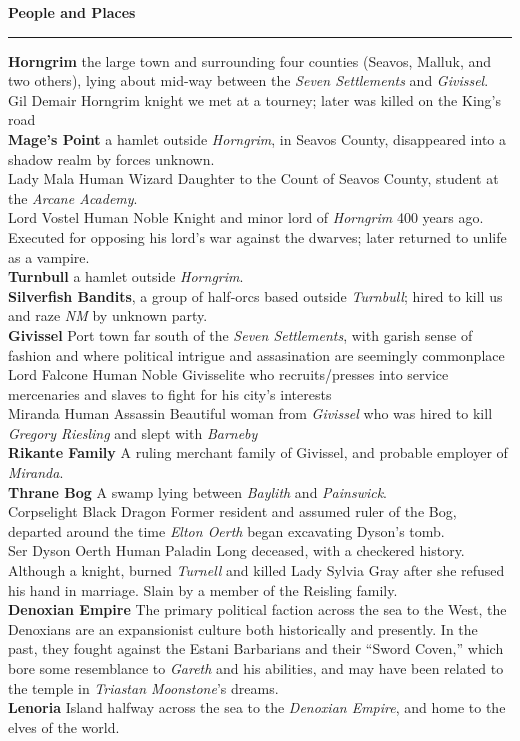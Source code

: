 \documentclass[letterpaper]{article}
\newcommand{\e}[1]{\emph{#1}}
\newcommand{\B}[1]{\textbf{#1}}
\newenvironment{notesection}[1]
{ {\huge \B{#1}}\hrule\vspace{0.5em}\begingroup\fontsize{9pt}{12pt}\selectfont}
{\endgroup}
\newcommand{\person}[3]{#1\B{
    \ifstrequal{#2}{M}{{\color{ProcessBlue}\male}}{%
    \ifstrequal{#2}{F}{\color{VioletRed}\female}{}}} #3}
\begin{document}
\begin{notesection}{People and Places}
\B{Horngrim} the large town and surrounding four counties (Seavos, Malluk, and two others), lying about mid-way between the \e{Seven Settlements} and \e{Givissel}.\\
\person{Gil Demair} \e{Horngrim} knight we met at a tourney; later was killed on the King's road\\
\B{Mage's Point} a hamlet outside \e{Horngrim}, in Seavos County, disappeared into a shadow realm by forces unknown.\\
\person{Lady Mala}{F}{Human Wizard} Daughter to the Count of Seavos County, student at the \e{Arcane Academy}.\\
\person{Lord Vostel}{M}{Human Noble} Knight and minor lord of \e{Horngrim} 400 years ago. Executed for opposing his lord's war against the dwarves; later returned to unlife as a vampire.\\
\B{Turnbull} a hamlet outside \e{Horngrim}.\\
\B{Silverfish Bandits}, a group of half-orcs based outside \e{Turnbull}; hired to kill us and raze \e{NM} by unknown party.\\

\B{Givissel} Port town far south of the \e{Seven Settlements}, with garish sense of fashion and where political intrigue and assasination are seemingly commonplace \\
\person{Lord Falcone}{M}{Human Noble} Givisselite who recruits/presses into service mercenaries and slaves to fight for his city's interests\\
\person{Miranda}{F}{Human Assassin} Beautiful woman from \e{Givissel} who was hired to kill \e{Gregory Riesling} and slept with \e{Barneby} \\
\B{Rikante Family} A ruling merchant family of Givissel, and probable employer of \e{Miranda}.\\

\B{Thrane Bog} A swamp lying between \e{Baylith} and \e{Painswick}.\\
\person{Corpselight}{F}{Black Dragon} Former resident and assumed ruler of the Bog, departed around the time \e{Elton Oerth} began excavating Dyson's tomb.\\
\person{Ser Dyson Oerth}{M}{Human Paladin} Long deceased, with a checkered history. Although a knight, burned \e{Turnell} and killed Lady Sylvia Gray after she refused his hand in marriage. Slain by a member of the Reisling family.\\

\B{Denoxian Empire} The primary political faction across the sea to the West, the Denoxians are an expansionist culture both historically and presently. In the past, they fought against the Estani Barbarians and their ``Sword Coven,'' which bore some resemblance to \e{Gareth} and his abilities, and may have been related to the temple in \e{Triastan Moonstone}'s dreams.\\
\B{Lenoria} Island halfway across the sea to the \e{Denoxian Empire}, and home to the elves of the world.\\
\end{notesection}
\end{document}
